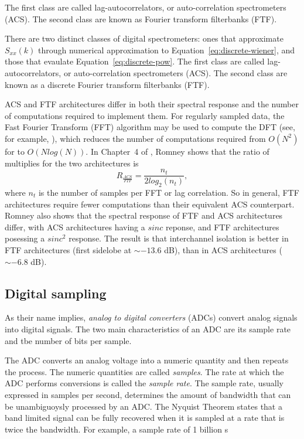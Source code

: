 \documentclass{ws-rv961x669}
\begin{document}
The first class are called lag-autocorrelators, or auto-correlation spectrometers (ACS). The second class are known as Fourier transform filterbanks (FTF).

There are two distinct classes of digital spectrometers: ones that approximate $S_{xx}(k)$ through numerical approximation to Equation~\ref{eq:discrete-wiener}, and those that evaulate Equation~\ref{eq:discrete-pow}. The first class are called lag-autocorrelators, or auto-correlation spectrometers (ACS). The second class are known as a discrete Fourier transform filterbanks (FTF).  

ACS and FTF architectures differ in both their spectral response and
the number of computations required to implement them. For regularly
sampled data, the Fast Fourier Transform (FFT) algorithm may be used
to compute the DFT (see, for example, \citep{BookBrighamFFT}),
which reduces the number of computations required from $O(N^{2})$
for to $O(Nlog(N))$. In Chapter~4 of \citep{Taylor1999}, Romney
shows that the ratio of multiplies for the two architectures is
\begin{equation}
R_{\frac{ACS}{FTF}}=\frac{n_{t}}{\mbox{2}log_{2}(n_{t})},
\end{equation}
where $n_{t}$ is the number of samples per FFT or lag correlation.
So in general, FTF architectures require fewer computations than their
equivalent ACS counterpart. Romney also shows that the spectral response
of FTF and ACS architectures differ, with ACS architectures having
a $sinc$ reponse, and FTF architectures posessing a $sinc^{2}$ response.
The result is that interchannel isolation is better in FTF architectures
(first sidelobe at $\sim-\mbox{13.6}$ dB), than in ACS architectures
($\sim-\mbox{6.8}$ dB). 

\subsection{Digital sampling}

As their name implies, \emph{analog to digital converters} (ADCs)
convert analog signals into digital signals. The two main
characteristics of an ADC are its sample rate and tbe number of bits per
sample.

The ADC converts an analog voltage into a numeric quantity and then
repeats the process. The numeric quantities are called \emph{samples}.
The rate at which the ADC performs conversions is called the
\emph{sample rate}. The sample rate, usually expressed in samples per
second, determines the amount of bandwidth that can be unambiguoysly
processed by an ADC. The Nyquist Theorem states that a band limited
signal can be fully recovered when it is sampled at a rate that is twice
the bandwidth. For example, a sample rate of 1 billion s
\end{document}
